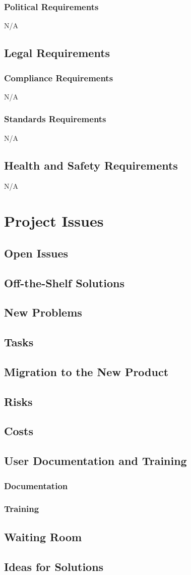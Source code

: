 \documentclass{article}
\begin{document}
    \subsubsection{Political Requirements}    N/A
    
\subsection{Legal Requirements}
    \subsubsection{Compliance Requirements}
    N/A
    
    \subsubsection{Standards Requirements} 
    N/A
\subsection{Health and Safety Requirements}
    N/A
\section{Project Issues}
\subsection{Open Issues}
\subsection{Off-the-Shelf Solutions}
\subsection{New Problems}
\subsection{Tasks}
\subsection{Migration to the New Product}
\subsection{Risks}
\subsection{Costs}
\subsection{User Documentation and Training}
\subsubsection{Documentation}
\subsubsection{Training}
\subsection{Waiting Room}
\subsection{Ideas for Solutions}
\end{document}
